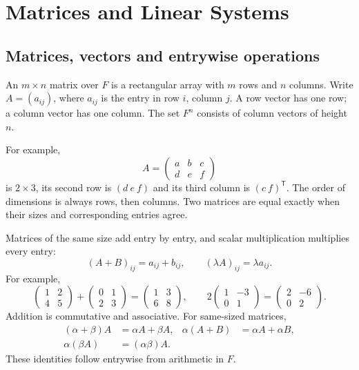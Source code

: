 \chapter{Matrices and Linear Systems}\label{chap:algebra-matrices}

\section{Matrices, vectors and entrywise operations}
\begin{definition}
An $m\times n$ matrix over $F$ is a rectangular array with $m$ rows and
$n$ columns. Write $A=(a_{ij})$, where $a_{ij}$ is the entry in row $i$,
column $j$. A row vector has one row; a column vector has one column.
The set $F^n$ consists of column vectors of height $n$.
\end{definition}
For example,
\[
A=\begin{pmatrix}a&b&c\\d&e&f\end{pmatrix}
\]
is $2\times3$, its second row is $(d\ e\ f)$ and its third column is
$(c\ f)^{\mathsf T}$. The order of dimensions is always rows, then columns.
Two matrices are equal exactly when their sizes and corresponding entries agree.

Matrices of the same size add entry by entry, and scalar multiplication
multiplies every entry:
\[
(A+B)_{ij}=a_{ij}+b_{ij},\qquad(\lambda A)_{ij}=\lambda a_{ij}.
\]
For example,
\[
\begin{pmatrix}1&2\\4&5\end{pmatrix}
+\begin{pmatrix}0&1\\2&3\end{pmatrix}
=\begin{pmatrix}1&3\\6&8\end{pmatrix},\qquad
2\begin{pmatrix}1&-3\\0&1\end{pmatrix}
=\begin{pmatrix}2&-6\\0&2\end{pmatrix}.
\]
Addition is commutative and associative. For same-sized matrices,
\begin{align*}
(\alpha+\beta)A&=\alpha A+\beta A,&
\alpha(A+B)&=\alpha A+\alpha B,\\
\alpha(\beta A)&=(\alpha\beta)A.
\end{align*}
These identities follow entrywise from arithmetic in $F$.

